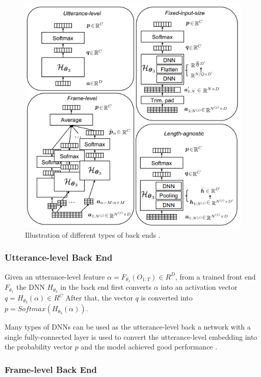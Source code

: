 \begin{figure}[htbp!]
    \centering
    \includegraphics{figures/backends.png}
    \caption{  Illustration of different types of back ends \cite{wang2022practical}.}
    \label{fig:mel-filter}
\end{figure}

\subsubsection{Utterance-level Back End}
Given an utterance-level feature $\alpha = F_{\theta_1}(O_{1:T}) \in R^{D}$, from a trained front end $F_{\theta_1}$ the \acs{DNN} $H_{\theta_3}$ in the back end first converts $\alpha$ into an activation vector $q = H_{\theta_3}(\alpha) \in R^{C}$ After that, the vector $q$ is converted into $p = Softmax(H_{\theta_3}(\alpha))$.

Many types of DNNs can be used as the utterance-level back a network with a single fully-connected layer is used to convert the utterance-level embedding into the probability vector $p$ and the model achieved good performance \cite{wang2022practical}.

\subsubsection{Frame-level Back End}

